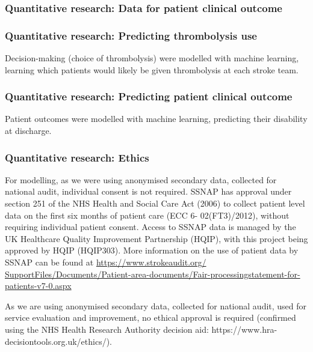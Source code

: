 \subsubsection{Quantitative research: Data for patient clinical outcome}



\subsubsection{Quantitative research: Predicting thrombolysis use}

Decision-making (choice of thrombolysis) were modelled with machine learning, learning which patients would likely be given thrombolysis at each stroke team.


\subsubsection{Quantitative research: Predicting patient clinical outcome}

Patient outcomes were modelled with machine learning, predicting their disability at discharge.


\subsubsection{Quantitative research: Ethics}

For modelling, as we were using anonymised secondary data, collected for national audit, individual consent is not required. SSNAP has approval under section 251 of the NHS Health and Social Care Act (2006) to collect patient level data on the first six months of patient care (ECC 6- 02(FT3)/2012), without requiring individual patient consent. Access to SSNAP data is managed by the UK Healthcare Quality Improvement Partnership (HQIP), with this project being approved by HQIP (HQIP303). More information on the use of patient data by SSNAP can be found at \url{https://www.strokeaudit.org/ SupportFiles/Documents/Patient-area-documents/Fair-processingstatement-for-patients-v7-0.aspx}

As we are using anonymised secondary data, collected for national audit, used for service evaluation and improvement, no ethical approval is required (confirmed using the NHS Health Research Authority decision aid: https://www.hra-decisiontools.org.uk/ethics/).